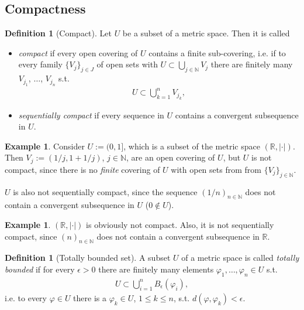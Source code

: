 \documentclass[12pt, a4paper]{article}
\numberwithin{equation}{section}
\theoremstyle{definition}
\theoremstyle{definition}
\newtheorem{defn}[thm]{Definition} %
\newtheorem{exmp}[thm]{Example} %
\newcommand{\abs}[1]{\left\vert #1 \right\vert}
\newcommand{\seq}[1][\varphi]{\left( #1 \right)_{n \in \mathbb{N}}}
\begin{document}
	\subsection{Compactness}
	\begin{defn}[Compact]
		Let $U$ be a subset of a metric space. Then it is called 
		\begin{itemize}
			\item \textit{compact} if every open covering of $U$ contains a finite sub-covering, i.e. if to every family $\{V_j\}_{j\in J}$ of open sets with $U \subset \bigcup_{j\in\mathbb N} V_j$ there are finitely many $V_{j_1}$, $\dots$, $V_{j_n}$ s.t. 
			\begin{align*}
				U \subset \bigcup_{k = 1}^{n}V_{j_k},
			\end{align*}
			\item \textit{sequentially compact} if every sequence in $U$ contains a convergent subsequence in $U$.
		\end{itemize}
	\end{defn}

	\begin{exmp}
		Consider $U := (0, 1]$, which is a subset of the metric space $(\mathbb R, \abs{\cdot})$. Then $V_j := (1/j, 1 + 1/j)$, $j\in\mathbb N$, are an open covering of $U$, but $U$ is not compact, since there is no \textit{finite} covering of $U$ with open sets from from $\{V_j\}_{j\in\mathbb N}$.
		
		$U$ is also not sequentially compact, since the sequence $\seq[1/n]$ does not contain a convergent subsequence in $U$ ($0\notin U$).
	\end{exmp}

	\begin{exmp}
		$(\mathbb R, \abs{\cdot})$ is obviously not compact. Also, it is not sequentially compact, since $\seq[n]$ does not contain a convergent subsequence in $\mathbb R$.
	\end{exmp}
	
	\begin{defn}[Totally bounded set]
		A subset $U$ of a metric space is called \textit{totally bounded} if for every $\epsilon > 0$ there are finitely many elements $\varphi_1, \dots, \varphi_n\in U$ s.t. 
		\begin{align*}
			U\subset \bigcup_{i = 1}^{n}B_{\epsilon}(\varphi_i),
		\end{align*}
		i.e. to every $\varphi\in U$ there is a $\varphi_k\in U$, $1\leq k\leq n$, s.t. $d(\varphi, \varphi_k) < \epsilon$.
	\end{defn}
\end{document}
